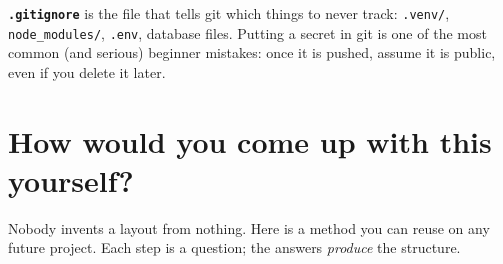 \documentclass[11pt,a4paper]{article}
\begin{document}
\noindent \textbf{\texttt{.gitignore}} is the file that tells git which things to never track:
\texttt{.venv/}, \texttt{node\_modules/}, \texttt{.env}, database files. Putting a secret in
git is one of the most common (and serious) beginner mistakes: once it is pushed, assume it is
public, even if you delete it later.

\section{How would you come up with this yourself?}

Nobody invents a layout from nothing. Here is a method you can reuse on any future project.
Each step is a question; the answers \emph{produce} the structure.
\end{document}
